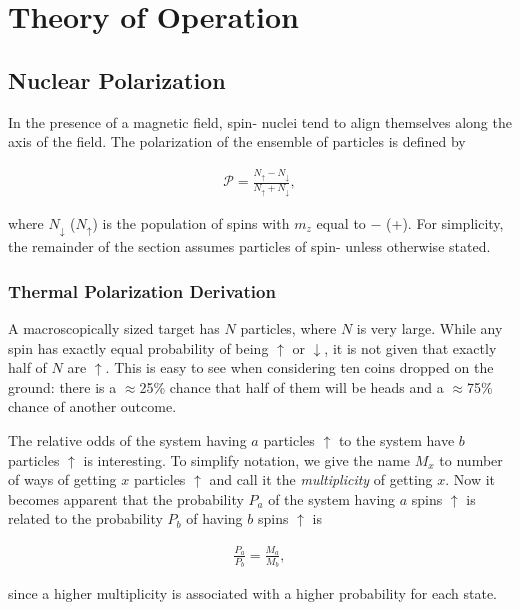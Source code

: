 \chapter{Theory of Operation} 
\label{theory}  
\section{Nuclear Polarization}
In the presence of a magnetic field, spin-\half{} nuclei tend to align themselves along the axis of the field.  The polarization of the ensemble of particles is defined by 

\begin{eqnarray}
\label{eqn:polarization-definition}
\mathcal{P}=\frac{N_\uparrow-N_\downarrow}{N_\uparrow+N_\downarrow},
\end{eqnarray}

where $N_\downarrow$ ($N_\uparrow$) is the population of spins with $m_z$ equal to $-$\half{} (+\half).  For simplicity, the remainder of the section assumes particles of spin-\half{} unless otherwise stated.

\subsection{Thermal Polarization Derivation}


A macroscopically sized target has $N$ particles, where $N$ is very large.  While any spin has exactly equal probability of being $\uparrow$ or $\downarrow$, it is not given that exactly half of $N$ are $\uparrow$.  This is easy to see when considering ten coins dropped on the ground: there is a $\approx$25\% chance that half of them will be heads and a $\approx$75\% chance of another outcome.


The relative odds of the system having $a$ particles $\uparrow$ to the system have $b$ particles $\uparrow$ is interesting.  To simplify notation, we give the name $M_x$ to number of ways of getting $x$ particles $\uparrow$ and call it the \textit{multiplicity} of getting $x$.  Now it becomes apparent that the probability $P_a$ of the system having $a$ spins $\uparrow$ is related to the probability $P_b$ of having $b$ spins $\uparrow$ is

\begin{eqnarray}
 \frac{P_a}{P_b} = \frac{M_a}{M_b},
\end{eqnarray}

since a higher multiplicity is associated with a higher probability for each state.

